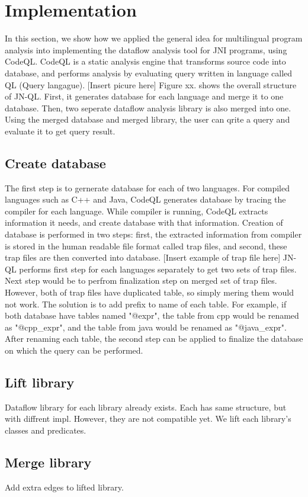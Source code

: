 \section{Implementation}
In this section, we show how we applied the general idea for multilingual program analysis
into implementing the dataflow analysis tool for JNI programs, using CodeQL. CodeQL is a
static analysis engine that transforms source code into database, and performs analysis by
evaluating query written in language called QL (Query langague).
[Insert picure here]
Figure xx. shows the overall structure of JN-QL. First, it generates database for each language
and merge it to one database. Then, two seperate dataflow analysis library is also
merged into one. Using the merged database and merged library, the user can
qrite a query and evaluate it to get query result.

\subsection{Create database}
The first step is to gernerate database for each of two languages. 
For compiled languages such as C++ and Java, CodeQL generates database by
tracing the compiler for each language. While compiler is running, CodeQL
extracts information it needs, and create database with that information.
Creation of database is performed in two steps: first, the extracted information from compiler is
stored in the human readable file format
called trap files, and second, these trap files are then converted into database.
[Insert example of trap file here]
JN-QL performs first step for each languages separately to get two sets of trap files.
Next step would be to perfrom finalization step on merged set of trap files. However, both of
trap files have duplicated table, so simply mering them would not work. The solution is to add
prefix to name of each table. For example, if both database have tables named "@expr",
the table from cpp would be renamed as "@cpp\_expr", and the table from java would be renamed as
"@java\_expr". After renaming each table, the second step can be applied to finalize the database
on which the query can be performed.

\subsection{Lift library}
Dataflow library for each library already exists.
Each has same structure, but with diffrent impl.
However, they are not compatible yet.
We lift each library's classes and predicates.

\subsection{Merge library}
Add extra edges to lifted library.
